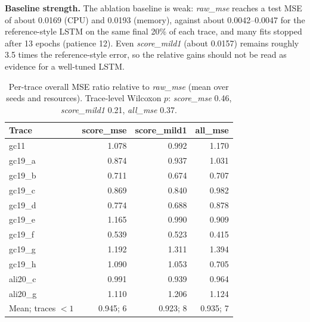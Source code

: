 \documentclass[conference]{IEEEtran}
\begin{document}
\textbf{Baseline strength.} The ablation baseline is weak: \emph{raw\_mse} reaches
a test MSE of about 0.0169 (CPU) and 0.0193 (memory), against about 0.0042--0.0047
for the reference-style LSTM on the same final 20\% of each trace, and many fits
stopped after 13 epochs (patience 12). Even \emph{score\_mild1} (about 0.0157)
remains roughly 3.5 times the reference-style error, so the relative gains should
not be read as evidence for a well-tuned LSTM.

\begin{table}[!t]
\caption{LSTM ablation: mean paired test-metric ratios relative to the
raw-feature MSE baseline (below one is better).}
\label{tab:ablation}
\centering
\scriptsize
\setlength{\tabcolsep}{3pt}
\end{table}

\begin{table}[!t]
\caption{Per-trace overall MSE ratio relative to \emph{raw\_mse} (mean over
seeds and resources). Trace-level Wilcoxon $p$: \emph{score\_mse} 0.46,
\emph{score\_mild1} 0.21, \emph{all\_mse} 0.37.}
\label{tab:pertrace}
\centering
\scriptsize
\setlength{\tabcolsep}{6pt}
\begin{tabular}{lrrr}
\toprule
Trace & score\_mse & score\_mild1 & all\_mse \\
\midrule
gc11 & 1.078 & 0.992 & 1.170 \\
gc19\_a & 0.874 & 0.937 & 1.031 \\
gc19\_b & 0.711 & 0.674 & 0.707 \\
gc19\_c & 0.869 & 0.840 & 0.982 \\
gc19\_d & 0.774 & 0.688 & 0.878 \\
gc19\_e & 1.165 & 0.990 & 0.909 \\
gc19\_f & 0.539 & 0.523 & 0.415 \\
gc19\_g & 1.192 & 1.311 & 1.394 \\
gc19\_h & 1.090 & 1.053 & 0.705 \\
ali20\_c & 0.991 & 0.939 & 0.964 \\
ali20\_g & 1.110 & 1.206 & 1.124 \\
\midrule
Mean; traces $<1$ & 0.945; 6 & 0.923; 8 & 0.935; 7 \\
\bottomrule
\end{tabular}
\end{table}
\end{document}
